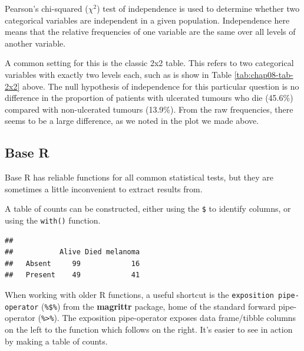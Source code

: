 \documentclass[
  12pt,
  krantz2]{krantz}
\makeatletter
\newenvironment{Shaded}{\begin{snugshade}}{\end{snugshade}}
\newcommand{\CommentTok}[1]{\textcolor[rgb]{0.56,0.35,0.01}{\textit{#1}}}
\newcommand{\KeywordTok}[1]{\textcolor[rgb]{0.13,0.29,0.53}{\textbf{#1}}}
\newcommand{\NormalTok}[1]{#1}
\newcommand{\OperatorTok}[1]{\textcolor[rgb]{0.81,0.36,0.00}{\textbf{#1}}}
\newenvironment{kframe}{%
\medskip{}
\setlength{\fboxsep}{.8em}
 \def\at@end@of@kframe{}%
 \ifinner\ifhmode%
  \def\at@end@of@kframe{\end{minipage}}%
  \begin{minipage}{\columnwidth}%
 \fi\fi%
 \def\FrameCommand##1{\hskip\@totalleftmargin \hskip-\fboxsep
 \colorbox{shadecolor}{##1}\hskip-\fboxsep
     \hskip-\linewidth \hskip-\@totalleftmargin \hskip\columnwidth}%
 \MakeFramed {\advance\hsize-\width
   \@totalleftmargin\z@ \linewidth\hsize
   \@setminipage}}%
 {\par\unskip\endMakeFramed%
 \at@end@of@kframe}
\renewenvironment{Shaded}{\begin{kframe}}{\end{kframe}}
\makeatother
\begin{document}

Pearson's chi-squared (\(\chi^2\)) test of independence is used to determine whether two categorical variables are independent in a given population.
Independence here means that the relative frequencies of one variable are the same over all levels of another variable.

A common setting for this is the classic 2x2 table.
This refers to two categorical variables with exactly two levels each, such as is show in Table \ref{tab:chap08-tab-2x2} above.
The null hypothesis of independence for this particular question is no difference in the proportion of patients with ulcerated tumours who die (45.6\%) compared with non-ulcerated tumours (13.9\%).
From the raw frequencies, there seems to be a large difference, as we noted in the plot we made above.

\hypertarget{base-r}{%
\subsection{Base R}\label{base-r}}

Base R has reliable functions for all common statistical tests, but they are sometimes a little inconvenient to extract results from.

A table of counts can be constructed, either using the \texttt{\$} to identify columns, or using the \texttt{with()} function.

\begin{Shaded}
\end{Shaded}

\begin{verbatim}
##          
##           Alive Died melanoma
##   Absent     99            16
##   Present    49            41
\end{verbatim}

When working with older R functions, a useful shortcut is the \texttt{exposition\ pipe-operator} (\texttt{\%\$\%}) from the \textbf{magrittr} package, home of the standard forward pipe-operator (\texttt{\%\textgreater{}\%}).
The exposition pipe-operator exposes data frame/tibble columns on the left to the function which follows on the right.
It's easier to see in action by making a table of counts.
\end{document}
